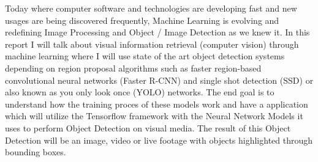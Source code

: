 
Today where computer software and technologies are developing fast and new usages are being discovered frequently, Machine
Learning is evolving and redefining Image Processing and Object / Image Detection as we knew it.
\newline
\newline
In this report I will talk about visual information retrieval (computer vision) through machine learning where I will use state of the art object detection systems depending on region proposal algorithms such as faster region-based convolutional neural networks (Faster R-CNN) and single shot detection (SSD) or also known as you only look once (YOLO) networks.
\newline
\newline
The end goal is to understand how the training proces of these models work and have a application which will utilize the Tensorflow framework with the Neural Network Models it uses to perform Object Detection on visual media. The result of this Object Detection will be an image, video or live footage with objects highlighted through bounding boxes.

